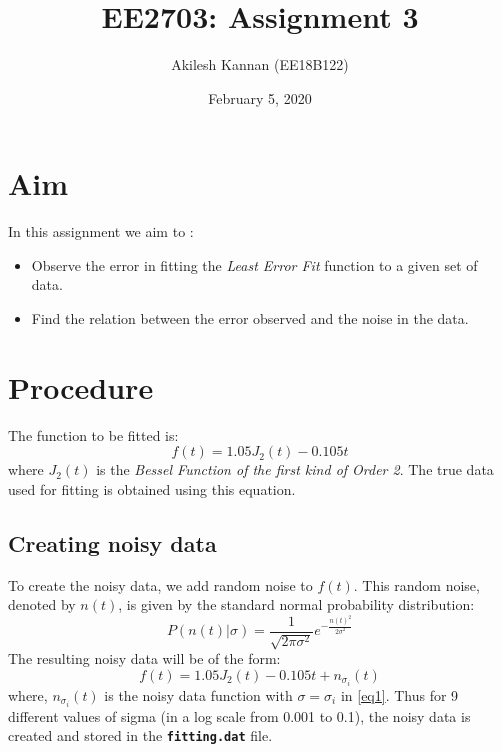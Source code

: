 \documentclass[11pt, a4paper]{article}
\title{EE2703: Assignment 3} %
\author{Akilesh Kannan (EE18B122)} %
\date{February 5, 2020} %
\begin{document}
    \maketitle %

    \section{Aim}
        In this assignment we aim to :
        \begin{itemize}
            \item Observe the error in fitting the \textit{Least Error Fit} function to a given set of data.
            \item Find the relation between the error observed and the noise in the data.
        \end{itemize}

    \section{Procedure}
        The function to be fitted is:
        \begin{equation*}
            f(t) = 1.05J_2(t)-0.105t
        \end{equation*}
        where $J_2(t)$ is the \textit{Bessel Function of the first kind of Order 2}. The true data used for fitting is obtained using this equation.

        \subsection{Creating noisy data}
            To create the noisy data, we add random noise to $f(t)$. This random noise, denoted by $n(t)$, is given by the standard normal probability distribution:
            \begin{equation}
                P(n(t)|\sigma)=\frac{1}{\sqrt{2\pi\sigma^2}}e^{-\frac{n(t)^2}{2\sigma^2}} \label{eq1}
            \end{equation}
            The resulting noisy data will be of the form:
            \begin{equation}
                f(t) = 1.05J_2(t)-0.105t+n_{\sigma_i}(t)
            \end{equation}
            where, $n_{\sigma_i}(t)$ is the noisy data function with $\sigma = \sigma_{i}$ in \eqref{eq1}. Thus for 9 different values of sigma (in a log scale from 0.001 to 0.1), the noisy data is created and stored in the \texttt{\textbf{fitting.dat}} file.
\end{document}
